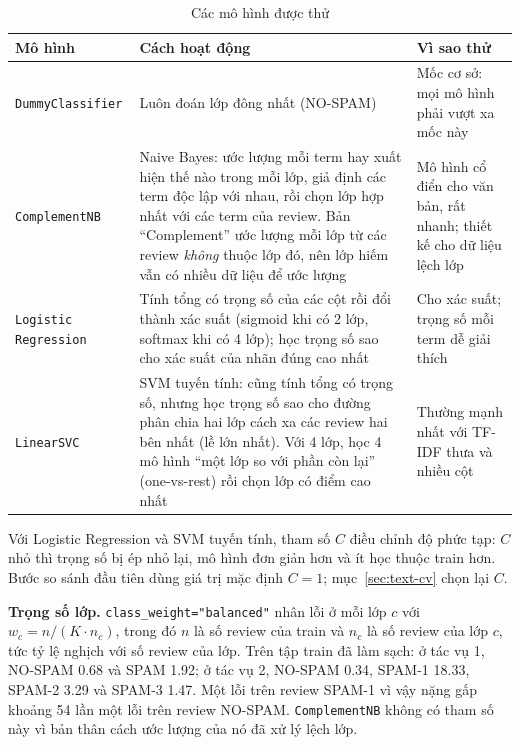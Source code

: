 \begin{table}[H]
\centering
\caption{Các mô hình được thử}
\label{tab:text-models}
\small
\begin{tabular}{>{\raggedright\arraybackslash}p{3.4cm}>{\raggedright\arraybackslash}p{7.4cm}>{\raggedright\arraybackslash}p{3.4cm}}
\toprule
Mô hình & Cách hoạt động & Vì sao thử\\
\midrule
\texttt{DummyClassifier} & Luôn đoán lớp đông nhất (NO-SPAM) & Mốc cơ sở: mọi mô hình phải vượt xa mốc này\\
\texttt{ComplementNB} & Naive Bayes: ước lượng mỗi term hay xuất hiện thế nào trong mỗi lớp, giả định các term độc lập với nhau, rồi chọn lớp hợp nhất với các term của review. Bản ``Complement'' ước lượng mỗi lớp từ các review \emph{không} thuộc lớp đó, nên lớp hiếm vẫn có nhiều dữ liệu để ước lượng & Mô hình cổ điển cho văn bản, rất nhanh; thiết kế cho dữ liệu lệch lớp\\
\texttt{Logistic Regression} & Tính tổng có trọng số của các cột rồi đổi thành xác suất (sigmoid khi có 2 lớp, softmax khi có 4 lớp); học trọng số sao cho xác suất của nhãn đúng cao nhất & Cho xác suất; trọng số mỗi term dễ giải thích\\
\texttt{LinearSVC} & SVM tuyến tính: cũng tính tổng có trọng số, nhưng học trọng số sao cho đường phân chia hai lớp cách xa các review hai bên nhất (lề lớn nhất). Với 4 lớp, học 4 mô hình ``một lớp so với phần còn lại'' (one-vs-rest) rồi chọn lớp có điểm cao nhất & Thường mạnh nhất với TF-IDF thưa và nhiều cột\\
\bottomrule
\end{tabular}
\end{table}

Với Logistic Regression và SVM tuyến tính, tham số $C$ điều chỉnh độ phức tạp: $C$ nhỏ thì trọng số bị ép nhỏ lại, mô hình đơn giản hơn và ít học thuộc train hơn.
Bước so sánh đầu tiên dùng giá trị mặc định $C = 1$; mục~\ref{sec:text-cv} chọn lại $C$.

\textbf{Trọng số lớp.} \texttt{class\_weight="balanced"} nhân lỗi ở mỗi lớp $c$ với $w_c = n / (K \cdot n_c)$, trong đó $n$ là số review của train
và $n_c$ là số review của lớp $c$, tức tỷ lệ nghịch với số review của lớp. Trên tập train đã làm sạch: ở tác vụ 1, NO-SPAM 0.68 và SPAM 1.92; ở tác vụ 2, NO-SPAM 0.34, SPAM-1 18.33, SPAM-2 3.29 và SPAM-3 1.47.
Một lỗi trên review SPAM-1 vì vậy nặng gấp khoảng 54 lần một lỗi trên review NO-SPAM. \texttt{ComplementNB} không có tham số này vì
bản thân cách ước lượng của nó đã xử lý lệch lớp.


